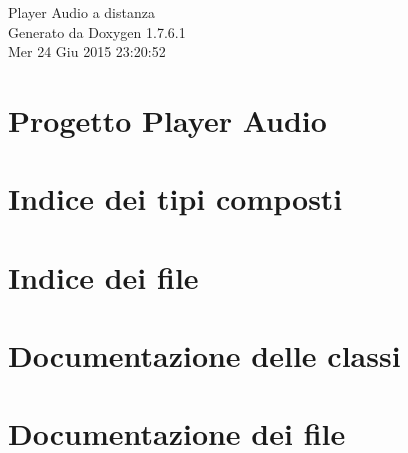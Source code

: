 \documentclass[a4paper]{book}
\begin{document}
\hypersetup{pageanchor=false,citecolor=blue}
\begin{titlepage}
\vspace*{7cm}
\begin{center}
{\Large \-Player \-Audio a distanza }\\
\vspace*{1cm}
{\large \-Generato da Doxygen 1.7.6.1}\\
\vspace*{0.5cm}
{\small Mer 24 Giu 2015 23:20:52}\\
\end{center}
\end{titlepage}
\clearemptydoublepage
{}
\tableofcontents
\clearemptydoublepage
{}
\hypersetup{pageanchor=true,citecolor=blue}
\chapter{\-Progetto \-Player \-Audio}
\label{index}\hypertarget{index}{}
\chapter{\-Indice dei tipi composti}

\chapter{\-Indice dei file}

\chapter{\-Documentazione delle classi}




\chapter{\-Documentazione dei file}






























\end{document}

